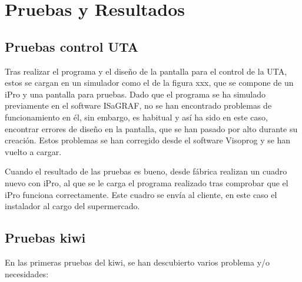 
\cleardoublepage
\chapter{Pruebas y Resultados}

\label{chap:resultados} %


\section{Pruebas control UTA}
\label{sec:pruebasUTA}

Tras realizar el programa y el diseño de la pantalla para el control de la UTA, estos se cargan en un simulador como el de la figura xxx, que se compone de un iPro y una pantalla para pruebas. Dado que el programa se ha simulado previamente en el software ISaGRAF, no se han encontrado problemas de funcionamiento en él, sin embargo, es habitual y así ha sido en este caso, encontrar errores de diseño en la pantalla, que se han pasado por alto durante su creación. Estos problemas se han corregido desde el software Visoprog y se han vuelto a cargar.

Cuando el resultado de las pruebas es bueno, desde fábrica realizan un cuadro nuevo con iPro, al que se le carga el programa realizado tras comprobar que el iPro funciona correctamente. Este cuadro se envía al cliente, en este caso el instalador al cargo del supermercado.


\section{Pruebas kiwi}
\label{sec:pruebasKiwi}

En las primeras pruebas del kiwi, se han descubierto varios problema y/o necesidades:

